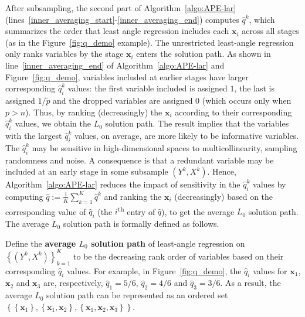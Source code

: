 \documentclass[11pt,review,authoryear]{elsarticle}
\begin{document}
After subsampling, the second part of Algorithm~\ref{algo:APE-lar} (lines~\ref{inner_averaging_start}-\ref{inner_averaging_end}) computes $\widehat{q}^k$, which summarizes the order that least angle regression includes each $\mathbf{x}_i$ across all stages (as in the Figure~\ref{fig:q_demo} example). The unrestricted least-angle regression only ranks variables by the stage $\mathbf{x}_i$ enters the solution path. As shown in line~\ref{inner_averaging_end} of Algorithm~\ref{algo:APE-lar} and Figure~\ref{fig:q_demo}, variables included at earlier stages have larger corresponding $\widehat{q}^k_i$ values: the first variable included is assigned $1$, the last is assigned $1/\widetilde{p}$ and the dropped variables are assigned $0$ (which occurs only when $p > n$). Thus, by ranking (decreasingly) the $\mathbf{x}_i$ according to their corresponding $\widehat{q}^k_i$ values, we obtain the $L_0$ solution path. The \citet[Theorem 2]{zhang09} result implies that the variables with the largest $\widehat{q}^k_i$ values, on average, are more likely to be informative variables. The $\widehat{q}^k_i$ may be sensitive in high-dimensional spaces to multicollinearity, sampling randomness and noise. A consequence is that a redundant variable may be included at an early stage in some subsample $\left( Y^k, X^k \right)$. Hence, Algorithm~\ref{algo:APE-lar} reduces the impact of sensitivity in the $\widehat{q}^k_i$ values by computing $\widehat{q} := \frac{1}{K} \sum_{k=1}^{K} \widehat{q}^k$ and ranking the $\mathbf{x}_i$ (decreasingly) based on the corresponding value of $\widehat{q}_i$ (the $i$\textsuperscript{th} entry of $\widehat{q}$), to get the average $L_0$ solution path. The average $L_0$ solution path is formally defined as follows.
%
\begin{definition}
  Define the \textbf{average $L_0$ solution path} of least-angle regression on $\left\{ \left( Y^k, X^k \right) \right\}_{k=1}^{K}$ to be the decreasing rank order of variables based on their corresponding $\widehat{q}_i$ values. For example, in Figure~\ref{fig:q_demo}, the $\widehat{q}_i$ values for $\mathbf{x}_1$, $\mathbf{x}_2$ and $\mathbf{x}_3$ are, respectively, $\widehat{q}_1 = 5/6$, $\widehat{q}_2 = 4/6$ and $\widehat{q}_3 = 3/6$. As a result, the average $L_0$ solution path can be represented as an ordered set $\left\{ \left\{ \mathbf{x}_1 \right\}, \left\{ \mathbf{x}_1, \mathbf{x}_2 \right\}, \left\{ \mathbf{x}_1, \mathbf{x}_2, \mathbf{x}_3 \right\} \right\}$.
  \label{def:L_0_solution_path}
\end{definition}
\end{document}
